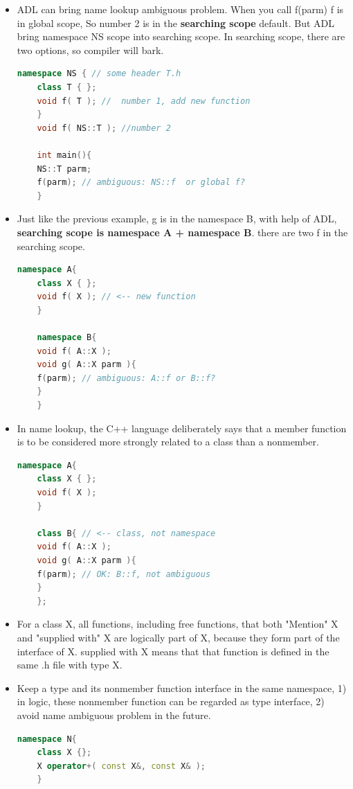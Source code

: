\documentclass[a4paper,11pt,twoside]{book}
\begin{document}
\begin{itemize}
	\item ADL can bring name lookup ambiguous problem.  When you call f(parm) f is in global scope, So number 2 is in the \textbf{searching scope} default. But ADL bring namespace NS scope into searching scope. In searching scope, there are two options, so compiler will bark.
	
	\begin{lstlisting}[frame=single, language=c++]
	namespace NS { // some header T.h
	class T { };
	void f( T ); //  number 1, add new function
	}
	void f( NS::T ); //number 2
	
	int main(){
	NS::T parm;
	f(parm); // ambiguous: NS::f  or global f?
	}
	\end{lstlisting}
	
	\item Just like the previous example, g is in the namespace B, with help of ADL, \textbf{searching scope is namespace A + namespace B}. there are two f in the searching scope.
	
	\begin{lstlisting}[frame=single, language=c++]
	namespace A{
	class X { };
	void f( X ); // <-- new function
	}
	
	namespace B{
	void f( A::X );
	void g( A::X parm ){
	f(parm); // ambiguous: A::f or B::f?
	}
	}
	\end{lstlisting}
	
	\item In name lookup, the C++ language deliberately says that a member function is to be considered more strongly related to a class than a nonmember.
	\begin{lstlisting}[frame=single, language=c++]
	namespace A{
	class X { };
	void f( X );
	}
	
	class B{ // <-- class, not namespace
	void f( A::X );
	void g( A::X parm ){
	f(parm); // OK: B::f, not ambiguous
	}
	};
	\end{lstlisting}
	
	\item For a class X, all functions, including free functions, that both "Mention" X
	and "supplied with" X are logically part of X, because they form part of the interface of X. supplied with X means that that function is defined in the same .h file with type X. 
	
	\item Keep a type and its nonmember function interface in the same namespace, 1) in logic, these nonmember function can be regarded as type interface, 2) avoid name ambiguous problem in the future.
	\begin{lstlisting}[frame=single, language=c++]
	namespace N{
	class X {};
	X operator+( const X&, const X& );
	}
	

\end{lstlisting}
\end{itemize}
\end{document}
